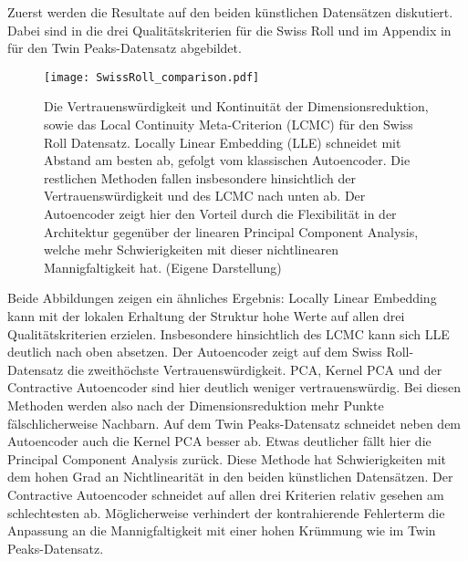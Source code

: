 Zuerst werden die Resultate auf den beiden künstlichen Datensätzen diskutiert. Dabei sind in
 die drei Qualitätskriterien für die Swiss Roll und im Appendix in
 für den Twin Peaks-Datensatz abgebildet.
\begin{figure}[ht]
	\begin{center}
		\texttt{[image: SwissRoll\_comparison.pdf]}
	\end{center}
	\caption[Qualitätskriterien für die Swiss Roll]{Die Vertrauenswürdigkeit und Kontinuität der Dimensionsreduktion, sowie das Local Continuity Meta-Criterion (LCMC) für den Swiss Roll Datensatz. Locally Linear Embedding (LLE) schneidet mit Abstand am besten ab, gefolgt vom klassischen Autoencoder. Die restlichen Methoden fallen insbesondere hinsichtlich der Vertrauenswürdigkeit und des LCMC nach unten ab. Der Autoencoder zeigt hier den Vorteil durch die Flexibilität in der Architektur gegenüber der linearen Principal Component Analysis, welche mehr Schwierigkeiten mit dieser nichtlinearen Mannigfaltigkeit hat. (Eigene Darstellung)}
	\label{fig:SwissRollMetrics}
\end{figure}
Beide Abbildungen zeigen ein ähnliches Ergebnis: Locally Linear Embedding kann mit der lokalen Erhaltung der Struktur hohe Werte auf allen drei Qualitätskriterien erzielen. Insbesondere hinsichtlich des LCMC kann sich LLE deutlich nach oben absetzen.
Der Autoencoder zeigt auf dem Swiss Roll-Datensatz die zweithöchste Vertrauenswürdigkeit. PCA, Kernel PCA und der Contractive Autoencoder sind hier deutlich weniger vertrauenswürdig. Bei diesen Methoden werden also nach der Dimensionsreduktion mehr Punkte fälschlicherweise Nachbarn. Auf dem Twin Peaks-Datensatz schneidet neben dem Autoencoder auch die Kernel PCA besser ab. Etwas deutlicher fällt hier die Principal Component Analysis zurück. Diese Methode hat Schwierigkeiten mit dem hohen Grad an Nichtlinearität in den beiden künstlichen Datensätzen. Der Contractive Autoencoder schneidet auf allen drei Kriterien relativ gesehen am schlechtesten ab. Möglicherweise verhindert der kontrahierende Fehlerterm die Anpassung an die Mannigfaltigkeit mit einer hohen Krümmung wie im Twin Peaks-Datensatz.

